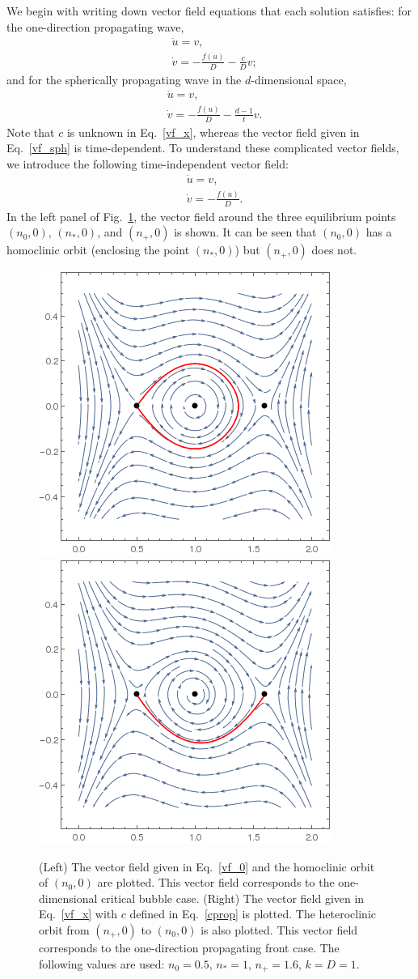 \documentclass{article}
\begin{document}
We begin with writing down vector field equations that each solution satisfies: 
for the one-direction propagating wave, 
\begin{equation}
\label{vf_x}
\begin{split}
&\dot{u}=v,\\
&\dot{v}=-\frac{f(u)}{D}-\frac{c}{D}v;
\end{split}
\end{equation}
and for the spherically propagating wave in the $d$-dimensional space,
\begin{equation}
\label{vf_sph}
\begin{split}
&\dot{u}=v,\\
&\dot{v}=-\frac{f(u)}{D}-\frac{d-1}{t}v.
\end{split}
\end{equation}
Note that $c$ is unknown in Eq.~\eqref{vf_x}, whereas the vector field given in Eq.~\eqref{vf_sph} is time-dependent.
To understand these complicated vector fields, we introduce the following time-independent vector field:
\begin{equation}
\label{vf_0}
\begin{split}
&\dot{u}=v,\\
&\dot{v}=-\frac{f(u)}{D}.
\end{split}
\end{equation}
In the left panel of Fig.~\ref{fig_vf_b1_p}, the vector field around the three equilibrium points $(n_0,0)$, $(n_*,0)$, and $(n_+,0)$ is shown.
It can be seen that $(n_0,0)$ has a homoclinic orbit (enclosing the point $(n_*,0)$) but $(n_+,0)$ does not.

\begin{figure}
\centering
\includegraphics[width=0.3\linewidth]{fig1/vector_field_b1.png}
\hspace{5mm}
\includegraphics[width=0.3\linewidth]{fig1/vector_field_p.png}
\caption{\label{fig_vf_b1_p}(Left) The vector field given in Eq.~\eqref{vf_0} and the homoclinic orbit of $(n_0,0)$ are plotted. This vector field corresponds to the one-dimensional critical bubble case. (Right) The vector field given in Eq.~\eqref{vf_x} with $c$ defined in Eq.~\eqref{cprop} is plotted. The heteroclinic orbit from $(n_+,0)$ to $(n_0,0)$ is also plotted. This vector field corresponds to the one-direction propagating front case. The following values are used: $n_0=0.5$, $n_*=1$, $n_+=1.6$, $k=D=1$.}
\end{figure}
\end{document}
